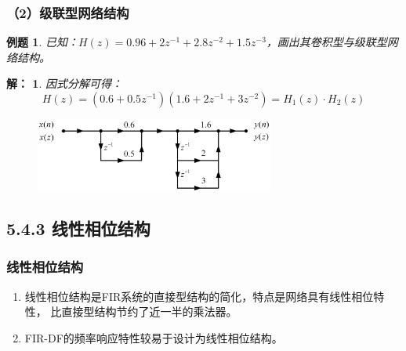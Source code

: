 \documentclass[notheorems,compress,mathserif,table]{beamer}
\newtheorem{example}{例题}
\newtheorem{answer}{解：}
\begin{document}
\begin{frame}[shrink]\frametitle{（2）级联型网络结构}%
\begin{example}
已知：$H(z) = 0.96+2z^{-1}+2.8z^{-2}+1.5z^{-3}$，画出其卷积型与级联型网络结构。
\end{example}
\begin{answer}
因式分解可得：
$$H(z) = (0.6+0.5z^{-1})(1.6+2z^{-1}+3z^{-2})=H_1(z)\cdot H_2(z)$$
\begin{figure}[h]
\centering
\includegraphics[width=0.7\textwidth]{lijilianxing.jpg}
\end{figure}
\end{answer}
\end{frame}
\subsection{5.4.3 线性相位结构}
\begin{frame}\frametitle{线性相位结构}%
\begin{enumerate}
  \item 线性相位结构是FIR系统的直接型结构的简化，特点是网络具有线性相位特性，
比直接型结构节约了近一半的乘法器。
  \item FIR-DF的频率响应特性较易于设计为线性相位结构。
\end{enumerate}



\end{frame}
\end{document}
